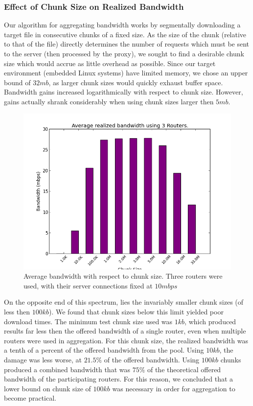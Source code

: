 \documentclass[12pt]{article}
\begin{document}
	\subsubsection{Effect of Chunk Size on Realized Bandwidth}

		Our algorithm for aggregating bandwidth works by segmentally downloading a target file in consecutive chunks of a fixed size. As the size of the chunk (relative to that of the file) directly determines the number of requests which must be sent to the server (then processed by the proxy), we sought to find a desirable chunk size which would accrue as little overhead as possible. Since our target environment (embedded Linux systems) have limited memory, we chose an upper bound of $32 mb$, as larger chunk sizes would quickly exhaust buffer space. Bandwidth gains increased logarithmically with respect to chunk size. However, gains actually shrank considerably when using chunk sizes larger then $5 mb$. 
		
		\begin{figure}[H]
			\centering
			\includegraphics[keepaspectratio=true,scale=0.5]{all_sizes.png}
			\caption{Average bandwidth with respect to chunk size. Three routers were used, with their server connections fixed at $10 mbps$}
		\end{figure}

		On the opposite end of this spectrum, lies the invariably smaller chunk sizes (of less then $100 kb$). We found that chunk sizes below this limit yielded poor download times. The minimum test chunk size used was $1 kb$, which produced results far less then the offered bandwidth of a single router, even when multiple routers were used in aggregation. For this chunk size, the realized bandwidth was a tenth of a percent of the offered bandwidth from the pool. Using $10 kb$, the damage was less worse, at $21.5\%$ of the offered bandwidth. Using $100 kb$ chunks produced a combined bandwidth that was $75\%$ of the theoretical offered bandwidth of the participating routers. For this reason, we concluded that a lower bound on chunk size of $100 kb$ was necessary in order for aggregation to become practical.
\end{document}

